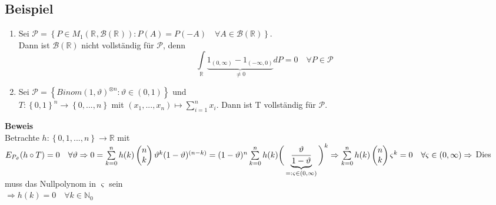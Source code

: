 \documentclass[german,10pt,oneside, fleqn, a4paper]{article}
\newcommand {\R}	{\mathbb{R}}
\newcommand {\N}	{\mathbb{N}}
\newcommand{\Ra}	{\Rightarrow}
\newcommand{\ra}{\rightarrow}
\newcommand{\sm}[2][\infty]{\sum\limits_{#2}^{#1}}
\newcommand{\brc}[1]{\left(#1\right)}
\newcommand{\brac}[1]{\left\lbrace #1\right\rbrace}
\newcommand{\mat}[1]{\begin{pmatrix}#1\end{pmatrix}}
\newcommand{\mc}[1]{\mathcal{#1}}
\newcommand{\beweis}{\textbf{Beweis}\\}
\newcommand{\1}[1]{1_{#1}}
\newcommand{\2}[1]{\1{\brac{#1}}}
\newcommand{\rbor}[1][d]{\brc{\R^{#1},\mc{B}\brc{\R^{#1}}}}
\newcommand{\intr}{\int\limits_\R}
\newcommand{\stuff}{{\otimes n}}
\begin{document}
\subsection{Beispiel}
\label{11.7}\begin{enumerate}[label=(\alph*)]
\item Sei $\mc{P}=\brac{P\in M_1\rbor[]:P(A)=P(-A)\quad\forall A\in\mc{B}(\R)}$.\\
Dann ist $\mc{B}(\R)$ nicht vollständig für $\mc{P}$, denn \[
\intr \underbrace{1_{(0,\infty)}-1_{(-\infty,0)}}_{\neq0}dP=0\quad\forall P\in\mc{P}\]
\item Sei $\mc{P}=\brac{Binom(1,\vartheta)^\stuff:\vartheta\in(0,1)}$ und \\
$T:\brac{0,1}^n\ra\brac{0,...,n}$ mit $(x_1,...,x_n)\mapsto\sm[n]{i=1}x_i$. Dann ist T vollständig für $\mc{P}$.
\end{enumerate}
\beweis
Betrachte $h:\brac{0,1,...,n}\ra\R$ mit $E_{P_\vartheta}(h\circ T)=0\quad\forall \vartheta\\
\Ra 0=\sm[n]{k=0}h(k)\mat{n\\k}\vartheta^k(1-\vartheta)^{(n-k)}\\
= (1-\vartheta)^n\sm[n]{k=0}h(k)\bigg(\underbrace{\dfrac{\vartheta}{1-\vartheta}}_{=:\varsigma\in(0,\infty)}\bigg)^k\\
\Ra\sm[n]{k=0}h(k)\mat{n\\k}\varsigma^k=0\quad\forall\varsigma\in(0,\infty)\\
\Ra$ Dies muss das Nullpolynom in $\varsigma$ sein\\
$\Ra h(k)=0\quad \forall k\in\N_0$




\iffalse
\end{document}
